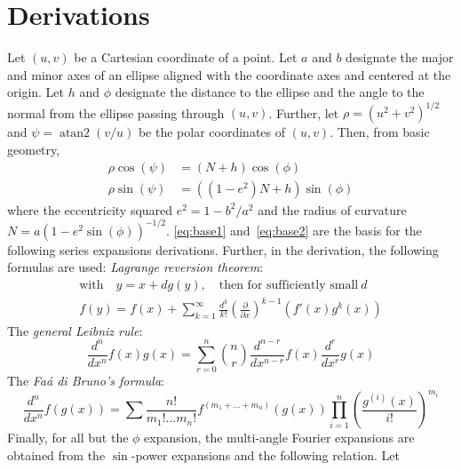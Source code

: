 \documentclass[a4paper]{amsart}
\DeclareMathOperator{\atantwo}{atan2}
\begin{document}
\section{Derivations}\label{app:A}
Let $(u,v)$ be a Cartesian coordinate of a point. Let $a$ and $b$ designate the major and minor axes of an ellipse aligned with the coordinate axes and centered at the origin. Let $h$ and $\phi$ designate the distance to the ellipse and the angle to the normal from the ellipse passing through $(u,v)$. Further, let $\rho=(u^2+v^2)^{1/2}$ and $\psi=\atantwo(v/u)$ be the polar coordinates of $(u,v)$. Then, from basic geometry,
\begin{align}
\label{eq:base1}
\rho\cos(\psi) &= (N + h)\cos(\phi)\\
\label{eq:base2}
\rho\sin(\psi) &= ((1-e^2)N + h)\sin(\phi)
\end{align}
where the eccentricity squared $e^2=1-b^2/a^2$ and the radius of curvature $N = a(1-e^2\sin(\phi))^{-1/2}$.
%
\eqref{eq:base1} and~\eqref{eq:base2} are the basis for the following series expansions derivations.
%
Further, in the derivation, the following formulas are used:
\newline
\emph{Lagrange reversion theorem}:
\begin{equation}
\begin{aligned}
\text{with}\quad y = x + d g(y),\quad\text{then for sufficiently small}\:d\\
f(y) = f(x) + \sum_{k=1}^{\infty}\frac{d^k}{k!}\left(\frac{\partial}{\partial x}\right)^{k-1}(f'(x)g^k(x))
\end{aligned}
\label{eq:lagrange}
\end{equation}
%
The \emph{general Leibniz rule}:
\begin{equation}
\frac{d^n}{dx^n}f(x)g(x) = \sum^n_{r=0}\binom{n}{r}\frac{d^{n-r}}{dx^{n-r}}f(x)\frac{d^r}{dx^r}g(x)\label{eq:leibniz}
\end{equation}
%
The \emph{Fa\'{a} di Bruno's formula}:
\begin{equation}
\frac{d^n}{dx^n}f(g(x))=\sum\frac{n!}{m_1!\dots m_n!} f^{(m_1+\dots+m_n)}(g(x))\prod_{i=1}^n\left(\frac{g^{(i)}(x)}{i!}\right)^{m_i}\label{eq:faa_di_bruno}
\end{equation}
%
Finally, for all but the $\phi$ expansion, the multi-angle Fourier expansions are obtained from the $\sin$-power expansions and the following relation. Let
\end{document}
